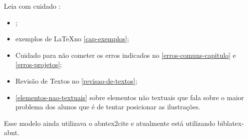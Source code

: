 Leia com cuidado :
\begin{itemize}
    \item {};
    
    \item exemplos de \LaTeX \space no \autoref{cap-exemplos};

    \item Cuidado para não cometer os erros indicados no \autoref{erros-comuns-capitulo} e \autoref{erros-projetos};
    
    \item Revisão de Textos no \autoref{revisao-de-textos};

    \item \autoref{elementos-nao-textuais} sobre elementos não textuais que fala sobre o maior problema dos alunos que é de tentar posicionar as ilustrações.
\end{itemize}


Esse modelo ainda utilizava o abntex2cite e atualmente está utilizando biblatex-abnt.


\noindent\hrulefill

\newpage

